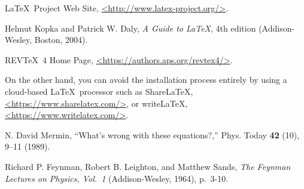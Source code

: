 \documentclass[prb,preprint]{revtex4-1}
\begin{document}
\begin{thebibliography}{9}


 \LaTeX\ Project Web Site, \url{<http://www.latex-project.org/>}.

Helmut Kopka and Patrick W. Daly, \textit{A Guide to
\LaTeX}, 4th edition (Addison-Wesley, Boston, 2004).

 REV\TeX\ 4 Home Page, \url{<https://authors.aps.org/revtex4/>}.

 On the other hand, you can avoid the installation process
entirely by using a cloud-based \LaTeX\ processor such as ShareLaTeX,
\url{<https://www.sharelatex.com/>}, or write\LaTeX, \url{<https://www.writelatex.com/>}.

 N. David Mermin, ``What's wrong with these equations?,'' 
Phys. Today \textbf{42} (10), 9--11 (1989).  

 Richard P. Feynman, Robert B. Leighton, and Matthew Sands, 
\textit{The Feynman Lectures on Physics, Vol.\ 1} (Addison-Wesley, 1964), p.~3-10.


\end{thebibliography}
\end{document}
